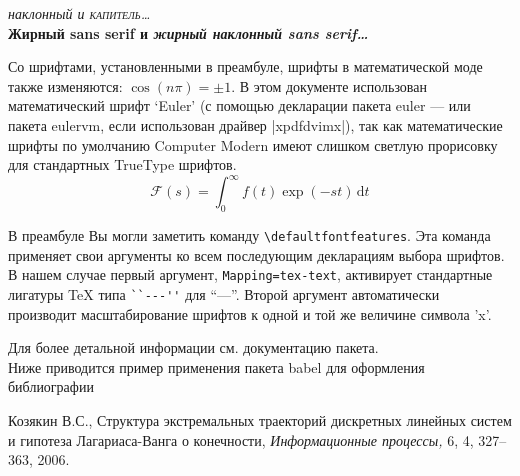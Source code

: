 \documentclass{article}
\begin{document}
\begin{center}
  {\itshape наклонный и \scshape капитель\dots}\\
  {\sffamily\bfseries Жирный sans serif и \itshape жирный
  наклонный sans serif\dots}
\end{center}

Со шрифтами, установленными в преамбуле, шрифты в математической моде также
изменяются: $\cos(n\pi)=\pm 1$. В этом документе использован математический
шрифт `Euler' (с помощью декларации пакета \textsf{euler} --- или пакета
\textsf{eulervm}, если использован драйвер |xpdfdvimx|), так как
математические шрифты по умолчанию Computer Modern имеют слишком светлую
прорисовку для стандартных TrueType шрифтов.
\[
\mathcal F(s) = \int^\infty_0 f(t) \exp(- st)\,\mathrm{d}t
\]

В преамбуле Вы могли заметить команду \verb|\defaultfontfeatures|. Эта
команда применяет свои аргументы ко всем последующим декларациям выбора
шрифтов. В нашем случае первый аргумент, \verb|Mapping=tex-text|, активирует
стандартные лигатуры \TeX{} типа \verb|``---''| для ``---''. Второй аргумент
автоматически производит масштабирование шрифтов к одной и той же величине
символа 'x'.

Для более детальной информации см. документацию пакета.\\

Ниже приводится пример применения пакета \textsf{babel} для оформления
библиографии

\begin{thebibliography}{2}
\bibitem{} Козякин В.С.,
    \newblock Структура экстремальных траекторий
    дискретных линейных систем и гипотеза Лагариаса-Ванга о
    конечности,
    \newblock \emph{Информационные процессы,} 6, 4, 327--363,
    2006.
\end{thebibliography}
\end{document}
